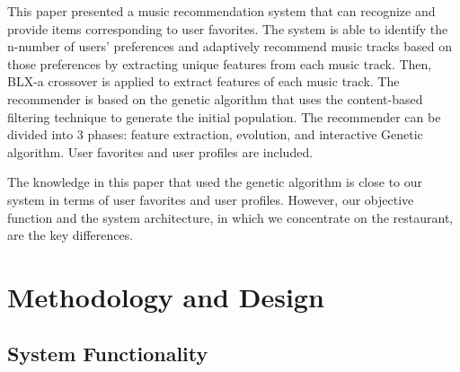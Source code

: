 \documentclass[12pt,oneside,openright,a4paper]{cpe-english-project}
\begin{document}
This paper presented a music recommendation system that can recognize and provide items corresponding to user favorites. The system is able to identify the n-number of users' preferences and adaptively recommend music tracks based on those preferences by extracting unique features from each music track. Then, BLX-a crossover is applied to extract features of each music track. \cite{MusicRecommender} The recommender is based on the genetic algorithm that uses the content-based filtering technique to generate the initial population. The recommender can be divided into 3 phases: feature extraction, evolution, and interactive Genetic algorithm. User favorites and user profiles are included.

The knowledge in this paper that used the genetic algorithm is close to our system in terms of user favorites and user profiles. However, our objective function and the system architecture, in which we concentrate on the restaurant, are the key differences.




\chapter{Methodology and Design}

\section{System Functionality}
\end{document}
